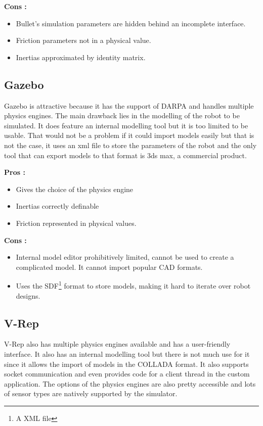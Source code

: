 \textbf{Cons :}
\begin{itemize}
\item Bullet's simulation parameters are hidden behind an incomplete interface.
\item Friction parameters not in a physical value.
\item Inertias approximated by identity matrix.
\end{itemize}

\subsection{Gazebo}
Gazebo is attractive because it has the support of DARPA and handles multiple physics engines. The main drawback lies in the modelling of the robot to be simulated. It does feature an internal modelling tool but it is too limited to be usable. That would not be a problem if it could import models easily but that is not the case, it uses an xml file to store the parameters of the robot and the only tool that can export models to that format is 3ds max, a commercial product.

\textbf{Pros :}
\begin{itemize}
\item Gives the choice of the physics engine
\item Inertias correctly definable
\item Friction represented in physical values.
\end{itemize}

\textbf{Cons :}
\begin{itemize}
\item Internal model editor prohibitively limited, cannot be used to create a complicated model. It cannot import popular CAD formats.
\item Uses the SDF\footnote{A XML file} format to store models, making it hard to iterate over robot designs.
\end{itemize}

\subsection{V-Rep}
V-Rep also has multiple physics engines available and has a user-friendly interface. It also has an internal modelling tool but there is not much use for it since it allows the import of models in the COLLADA format. It also supports socket communication and even provides code for a client thread in the custom application. The options of the physics engines are also pretty accessible and lots of sensor types are natively supported by the simulator.

